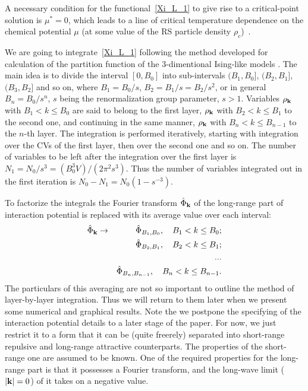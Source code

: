 A necessary condition for the functional~\eqref{Xi_L_1} to give rise to a critical-point solution is $\mu^* = 0$, which leads to a line of critical temperature dependence on the chemical potential $\mu$ (at some value of the RS particle density $\rho_c$)~\cite{RomaJPS2024}.

We are going to integrate~\eqref{Xi_L_1} following the method developed for calculation of the partition function of the 3-dimentional Ising-like models \cite{Yukh1989riv,Yukh2001book,MpkCMP2005}. The main idea is to divide the interval $[0, B_0]$ into sub-intervals $(B_1, B_0]$, $(B_2, B_1]$, $(B_3, B_2]$ and so on, where $B_1 = B_0/s$, $B_2 = B_1/s = B_2/s^2$, or in general $B_n = B_0/s^n$, $s$ being the renormalization group parameter, $s > 1.$ Variables $\rho_{\vb k}$ with $B_1 < k \leq B_0$ are said to belong to the first layer, $\rho_{\vb k}$ with $B_2 < k \leq B_1$ to the second one, and continuing in the same manner, $\rho_{\vb k}$ with $B_n < k \leq B_{n-1}$ to the $n$-th layer.
The integration is performed iteratively, starting with integration over the CVs of the first layer, then over the second one and so on.
The number of variables to be left after the integration over the first layer is $N_1 = N_0 / s^3 = (B_0^3 V)/(2\pi^2 s^3)$. Thus the number of variables integrated out in the first iteration is $N_0 - N_1 = N_0(1-s^{-3})$.

To factorize the integrals the Fourier transform $\hat{\Phi}_{\vb k}$ of the long-range part of interaction potential is replaced with its average value over each interval:
\begin{eqnarray*}
	\hat{\Phi}_{\vb k} & \rightarrow & \hat{\Phi}_{B_1, B_0}, \quad B_1 < k \leq B_0;
	\\
	& & \hat{\Phi}_{B_2, B_1}, \quad B_2 < k \leq B_1;
	\\
	& & ...
	\\
	& & \hat{\Phi}_{B_n, B_{n-1}}, \quad B_n < k \leq B_{n-1}.
\end{eqnarray*}
The particulars of this averaging are not so important to outline the method of layer-by-layer integration. Thus we will return to them later when we present some numerical and graphical results.
Note the we postpone the specifying of the interaction potential details to a later stage of the paper. For now, we just restrict it to a form that it can be (quite freerely) separated into short-range repulsive and long-range attractive counterparts.
The properties of the short-range one are assumed to be known. One of the required properties for the long-range part is that it possesses a Fourier transform, and the long-wave limit ($\abs{\vb k} = 0$) of it takes on a negative value.

